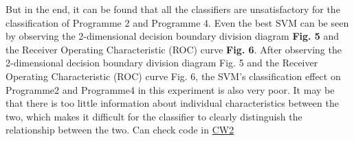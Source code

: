 \documentclass[twocolumn]{IEEEtran}
\begin{document}
But in the end, it can be found that all the classifiers are unsatisfactory for the classification of Programme 2 and Programme 4. Even the best SVM can be seen by observing the 2-dimensional decision boundary division diagram \textbf{Fig. 5} and the Receiver Operating Characteristic (ROC) curve \textbf{Fig. 6}. After observing the 2-dimensional decision boundary division diagram Fig. 5 and the Receiver Operating Characteristic (ROC) curve Fig. 6, the SVM's classification effect on Programme2 and Programme4 in this experiment is also very poor. It may be that there is too little information about individual characteristics between the two, which makes it difficult for the classifier to clearly distinguish the relationship between the two. Can check code in \href{https://github.com/Gustav-Yellow/XJTLU-ICS/tree/main/INT104}{\color{blue} CW2}
\end{document}
